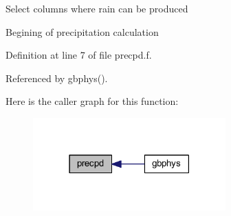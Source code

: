 \begin{DoxyEnumerate}
\item Select columns where rain can be produced
\item Begining of precipitation calculation 
\end{DoxyEnumerate}

Definition at line 7 of file precpd.\+f.



Referenced by gbphys().



Here is the caller graph for this function\+:
\nopagebreak
\begin{figure}[H]
\begin{center}
\leavevmode
\includegraphics[width=210pt]{precpd_8f_ae4ad929ece53fb2262d73d3a614c0600_icgraph}
\end{center}
\end{figure}


